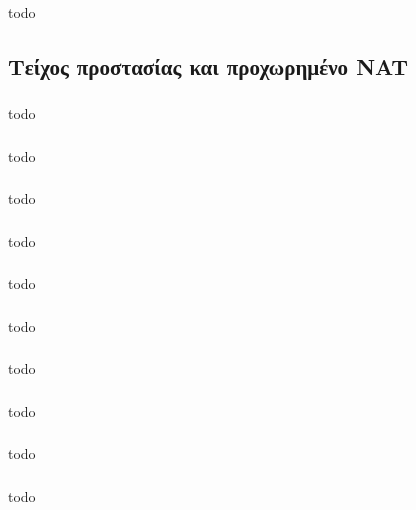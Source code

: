 \documentclass[a4paper, 12pt]{article}
\begin{document}
		\subsubsection{}
			todo

	\subsection{Τείχος προστασίας και προχωρημένο NAT}

		\subsubsection{}
			todo

		\subsubsection{}
			todo

		\subsubsection{}
			todo

		\subsubsection{}
			todo

		\subsubsection{}
			todo

		\subsubsection{}
			todo

		\subsubsection{}
			todo

		\subsubsection{}
			todo

		\subsubsection{}
			todo

		\subsubsection{}
			todo
\end{document}
